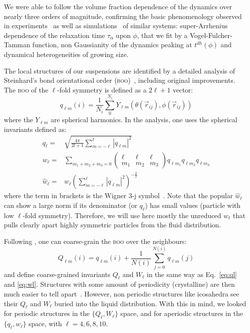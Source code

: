 \documentclass[11pt,a4paper]{article}
\begin{document}
We were able to follow the volume fraction dependence of the dynamics over nearly three orders of magnitude, confirming the basic phenomenology observed in experiments~\citep{pusey1987ogt, kegel2000swe, weeks2000, Berthier2005} as well as simulations~\citep{Kawasaki2010} of similar systems: super-Arrhenius dependence of the relaxation time $\tau_\alpha$ upon $\phi$, that we fit by a Vogel-Fulcher-Tamman function, non Gaussianity of the dynamics peaking at $t^{dh}(\phi)$ and dynamical heterogeneities of growing size.

The local structures of our suspensions are identified by a detailed analysis of Steinhard's bond orientational order (\textsc{boo})~\citep{steinhardt1983boo}, including original improvements. The \textsc{boo} of the $\ell$-fold symmetry is defined as a $2\ell+1$ vector:
\begin{equation}
	q_{\ell m}(i) = \frac{1}{N_i}\sum_{0}^{N_i} Y_{\ell m}(\theta(\vec r_{ij}),\phi(\vec r_{ij}))
	\label{eq:qlm}
\end{equation}
where the $Y_{\ell m}$ are spherical harmonics. In the analysis, one uses the spherical invariants defined as:
\begin{align}
	q_\ell =& \sqrt{\frac{4\pi}{2l+1} \sum_{m=-\ell}^{\ell} |q_{\ell m}|^2 }\label{eq:ql}\\
	w_\ell =& \sum_{m_1+m_2+m_3=0} 
			\left( \begin{array}{ccc}
				\ell & \ell & \ell \\
				m_1 & m_2 & m_3 
			\end{array} \right)
			q_{\ell m_1} q_{\ell m_2} q_{\ell m_3} \label{eq:wl}\\
	\hat{w}_\ell =& w_\ell{\left( \sum_{m=-\ell}^{\ell} |q_{\ell m}|^2 \right)}^{-\frac{3}{2}}
\end{align}
where the term in brackets is the Wigner 3-j symbol~\citep{Landau1965}. Note that the popular $\hat{w}_\ell$ can show a large norm if its denominator (or $q_\ell$) has small values (particle with low $\ell$-fold symmetry). Therefore, we will use here mostly the unreduced $w_\ell$ that pulls clearly apart highly symmetric particles from the fluid distribution.

Following \citet{Lechner2008}, one can coarse-grain the \textsc{boo} over the neighbours:
\begin{equation}
	Q_{\ell m}(i) = q_{\ell m}(i) + \frac{1}{N(i)} \sum_{j=0}^{N(i)} q_{\ell m}(j)
	\label{eq:Qlm}
\end{equation}
and define coarse-grained invariants $Q_\ell$ and $W_\ell$ in the same way as Eq.~\ref{eq:ql} and \ref{eq:wl}. Structures with some amount of periodicity (crystalline) are then much easier to tell apart~\citep{Lechner2008}. However, non periodic structures like icosahedra see their $Q_\ell$ and $W_\ell$ buried into the liquid distribution. With this in mind, we looked for periodic structures in the $\lbrace Q_\ell, W_\ell\rbrace$ space, and for aperiodic structures in the $\lbrace q_\ell, w_\ell\rbrace$ space, with $\ell=4,6,8,10$.
\end{document}
